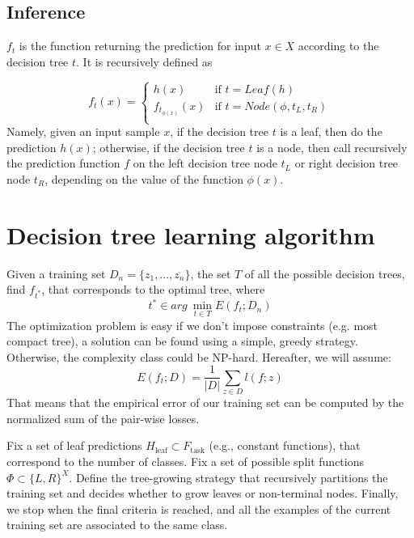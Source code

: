 \subsection{Inference}
\(f_t\) is the function returning the prediction for input \(x \in X\) according to the decision tree \(t\). It is recursively defined as

\begin{equation}
    f_t(x) = \begin{cases}
        h(x)               &\text{if } t = Leaf(h)\\
        f_{t_{\phi(x)}}(x)   &\text{if } t = Node(\phi,t_L,t_R)\\
    \end{cases}
\end{equation}
Namely, given an input sample \(x\), if the decision tree \(t\) is a leaf, then do the prediction \(h(x)\); otherwise, if the decision tree \(t\) is a node, then call recursively the prediction function \(f\) on the left decision tree node \(t_L\) or right decision tree node \(t_R\), depending on the value of the function \(\phi(x)\).

\section{Decision tree learning algorithm}
Given a training set \(D_n=\{z_1,...,z_n\}\), the set \(T\) of all the possible decision trees, find \(f_{t^*}\), that corresponds to the optimal tree, where 
\begin{equation}
    t^* \in arg\ \min_{t \in T} E(f_t;D_n)
\end{equation}
The optimization problem is easy if we don't impose constraints (e.g. most compact tree), a solution can be found using a simple, greedy strategy. Otherwise, the complexity class could be NP-hard. Hereafter, we will assume:
\begin{equation}
    E(f_t; D) = \frac 1 {|D|} \sum_{z \in D} l(f;z)
\end{equation}
That means that the empirical error of our training set can be computed by the normalized sum of the pair-wise losses.

Fix a set of leaf predictions \(H_\text{leaf} \subset F_\text{task}\) (e.g., constant functions), that correspond to the number of classes. Fix a set of possible split functions \(\Phi \subset \{L,R\}^X\). Define the tree-growing strategy that recursively partitions the training set and decides whether to grow leaves or non-terminal nodes. Finally, we stop when the final criteria is reached, and all the examples of the current training set are associated to the same class. 

